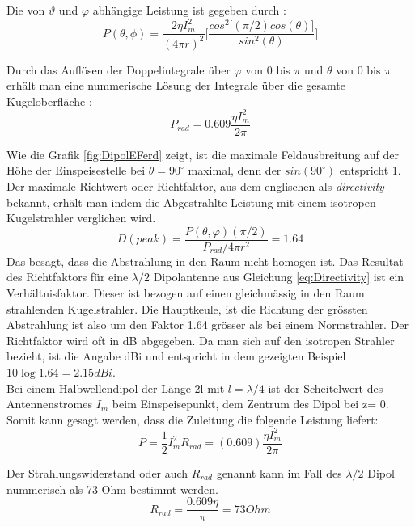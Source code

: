 Die von $\vartheta$ und $\varphi$ abhängige Leistung ist gegeben durch \cite{elliott1981antenna}:
\begin{equation}
P(\theta,\phi)=\frac{2\eta I_{m}^{2}}{(4\pi r)^{2}}\lbrack \frac{cos^{2}\lbrack (\pi/2) cos(\theta)\rbrack}{sin^{2}(\theta)}\rbrack
\end{equation}

Durch das Auflösen der Doppelintegrale über $\varphi$ von 0 bis $\pi$  und $\theta$ von 0 bis $\pi$ erhält man eine nummerische Lösung der Integrale über die gesamte Kugeloberfläche \cite{elliott1981antenna}:
\begin{equation}
P_{rad}=0.609 \frac{\eta I_{m}^{2}}{2\pi}
\end{equation}

Wie die  Grafik \ref{fig:DipolEFerd} zeigt, ist die maximale Feldausbreitung auf der Höhe der Einspeisestelle bei $\theta = 90 ^\circ $ maximal,  denn der  $sin(90 ^\circ ) $ entspricht 1.
Der maximale Richtwert oder Richtfaktor,  aus dem englischen als \textit{directivity} bekannt, erhält man indem die Abgestrahlte Leistung mit einem isotropen Kugelstrahler verglichen wird\cite{elliott1981antenna}.
\begin{equation}
D(peak)=\frac{P(\theta,\varphi)(\pi/2)}{P_{rad}/ 4 \pi r^{2}} =1.64
\label{eq:Directivity}
\end{equation}
Das besagt, dass die Abstrahlung in den Raum nicht homogen ist. Das Resultat des Richtfaktors für eine $\lambda /2$ Dipolantenne aus Gleichung \ref{eq:Directivity} ist ein Verhältnisfaktor. Dieser ist bezogen auf einen gleichmässig in den Raum strahlenden Kugelstrahler. Die Hauptkeule, ist die Richtung der grössten Abstrahlung ist also um den Faktor 1.64 grösser als bei einem Normstrahler. Der Richtfaktor wird oft in dB abgegeben. Da man sich auf den isotropen Strahler bezieht, ist die Angabe dBi und entspricht in dem gezeigten Beispiel $10\log{1.64}=2.15dBi$.\\

Bei einem Halbwellendipol der Länge 2l mit $l=\lambda/4 $ ist der Scheitelwert des Antennenstromes $I_{m}$ beim Einspeisepunkt, dem Zentrum des Dipol bei z= 0. Somit kann gesagt werden, dass die Zuleitung  die folgende Leistung  liefert:
\begin{equation}
P=\frac{1}{2} I_{m}^{2}R_{rad}=(0.609)\frac{\eta I_{m}^{2}}{2\pi}
\end{equation}

Der Strahlungswiderstand oder auch $R_{rad}$ genannt kann im Fall des $\lambda /2$ Dipol nummerisch als 73 Ohm bestimmt werden.
\begin{equation}\label{RradDipol}
R_{rad}=\frac{0.609 \eta}{\pi}= 73 Ohm
\end{equation}
